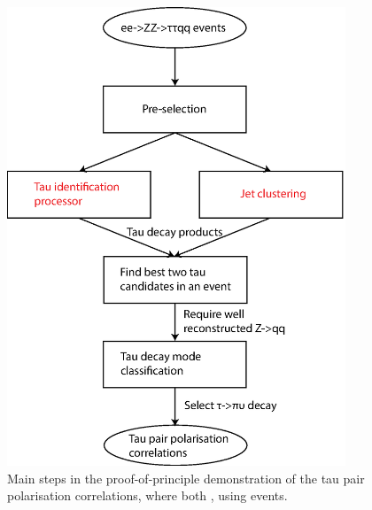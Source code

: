 \begin{figure}[htbp]
\centering %
  \includegraphics[width=0.9\textwidth]{tau/NoTimeAnalysis/tauNTAflow}
  \caption{Main steps in the proof-of-principle demonstration of the tau pair polarisation correlations, where both \tauToPionBoth, using  \eeZZQQ events.}
  \label{fig:TauNTAflow}
\end{figure}





